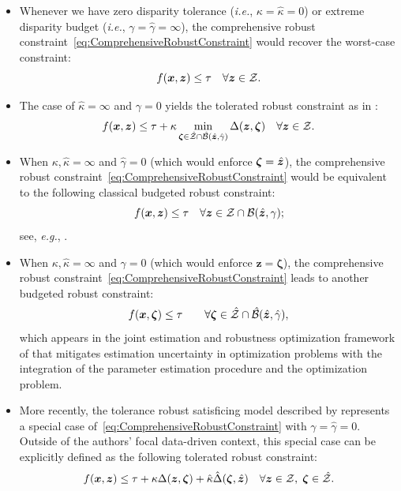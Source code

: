 \documentclass[opre, nonblindrev]{informswp}
\newcommand{\1}[1]{\mathds{1}{\left(#1\right)}}
\begin{document}
\begin{itemize}
\item Whenever we have zero disparity tolerance (\textit{i.e.}, $\kappa = \hat \kappa = 0$) or extreme disparity budget (\textit{i.e.}, $\gamma = \hat \gamma =\infty$),  the comprehensive robust constraint~\eqref{eq:ComprehensiveRobustConstraint} would recover the worst-case constraint:
\[
f(\bm x,\bm z) \leq \tau ~~~\forall \bm z \in \mathcal{Z}.
\]

\item The case of $\hat \kappa = \infty$ and $\gamma = 0$ yields the tolerated robust constraint as in \cite{BenTal_et_al_2017globalized}:
$$
f({\bm x},{\bm z}) \leq \tau + \kappa  \min_{\bm \zeta \in \hat {\mathcal{Z}} \cap \hat {\mathcal{B}}(\hat{\bm{z}}, \hat \gamma)} \Delta(\bm z,\bm \zeta)  ~~~\forall \bm z \in \mathcal{Z}.
$$

\item When $\kappa, \hat \kappa = \infty$ and $\hat \gamma=0$ (which would enforce $\bm \zeta = \hat{\bm{z}}$), the comprehensive robust constraint~\eqref{eq:ComprehensiveRobustConstraint} would be equivalent to the following classical budgeted robust constraint:
$$
f({\bm x},{\bm z}) \leq \tau ~~~\forall \bm z \in \mathcal{Z} \cap \mathcal{B}(\hat{\bm{z}}, \gamma);
$$ 
see, \textit{e.g.}, \cite{bertsimas2004price}.

\item When $\kappa, \hat \kappa = \infty$ and $\gamma = 0$ (which would enforce $\bm z = \bm \zeta$), the comprehensive robust constraint~\eqref{eq:ComprehensiveRobustConstraint} leads to another budgeted robust constraint:
$$
f({\bm x},{\bm \zeta}) \leq \tau \quad \quad \forall \bm \zeta \in \hat {\mathcal{Z}}\cap \hat {\mathcal{B}}(\hat{\bm{z}}, \hat \gamma),
$$
which appears in the joint estimation and robustness optimization framework of \cite{Zhu_Xie_Sim_2021joint} that mitigates estimation uncertainty in optimization problems with the integration of the parameter estimation procedure and the optimization problem.

\item More recently, the tolerance robust satisficing model described by \cite{sim2021analytics} represents a special case of~\eqref{eq:ComprehensiveRobustConstraint} with $\gamma = \hat \gamma = 0$. Outside of the authors' focal data-driven context, this special case can be explicitly defined as the following tolerated robust constraint:
$$
f(\bm x,\bm z) \leq \tau + \kappa \Delta(\bm z,\bm \zeta) + \hat \kappa \hat \Delta(\bm \zeta,\hat{\bm{z}}) ~~~\forall \bm z \in \mathcal{Z} , \; \bm \zeta \in \hat {\mathcal{Z}}.
$$
\end{itemize}
\end{document}
